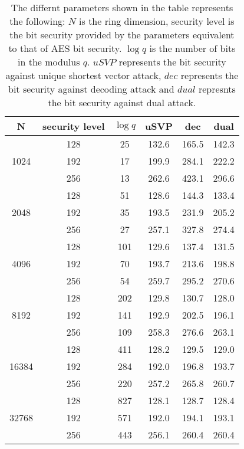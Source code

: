 \begin{table}[ht]
    \centering
    \begin{tabular}{|c|c|c|c|c|c|}
        \hline
        N                        & security level & $\log q$ & uSVP  & dec   & dual  \\
        \hline
        \multirow{3}{4em}{1024}  & 128            & 25       & 132.6 & 165.5 & 142.3 \\
                                 & 192            & 17       & 199.9 & 284.1 & 222.2 \\
                                 & 256            & 13       & 262.6 & 423.1 & 296.6 \\
        \hline
        \multirow{3}{4em}{2048}  & 128            & 51       & 128.6 & 144.3 & 133.4 \\
                                 & 192            & 35       & 193.5 & 231.9 & 205.2 \\
                                 & 256            & 27       & 257.1 & 327.8 & 274.4 \\
        \hline
        \multirow{3}{4em}{4096}  & 128            & 101      & 129.6 & 137.4 & 131.5 \\
                                 & 192            & 70       & 193.7 & 213.6 & 198.8 \\
                                 & 256            & 54       & 259.7 & 295.2 & 270.6 \\
        \hline
        \multirow{3}{4em}{8192}  & 128            & 202      & 129.8 & 130.7 & 128.0 \\
                                 & 192            & 141      & 192.9 & 202.5 & 196.1 \\
                                 & 256            & 109      & 258.3 & 276.6 & 263.1 \\
        \hline
        \multirow{3}{4em}{16384} & 128            & 411      & 128.2 & 129.5 & 129.0 \\
                                 & 192            & 284      & 192.0 & 196.8 & 193.7 \\
                                 & 256            & 220      & 257.2 & 265.8 & 260.7 \\
        \hline
        \multirow{3}{4em}{32768} & 128            & 827      & 128.1 & 128.7 & 128.4 \\
                                 & 192            & 571      & 192.0 & 194.1 & 193.1 \\
                                 & 256            & 443      & 256.1 & 260.4 & 260.4 \\
        \hline
    \end{tabular}
    \caption{The differnt parameters shown in the table represents the following: $N$ is the ring dimension, security level is the bit security provided by the parameters equivalent to that of AES bit security. $\log q$ is the number of bits in the modulus $q$. $uSVP$ represents the bit security against unique shortest vector attack, $dec$ represents the bit security against decoding attack and $dual$ represnts the bit security against dual attack.}
    \label{Tab:parameters_HE}
\end{table}



